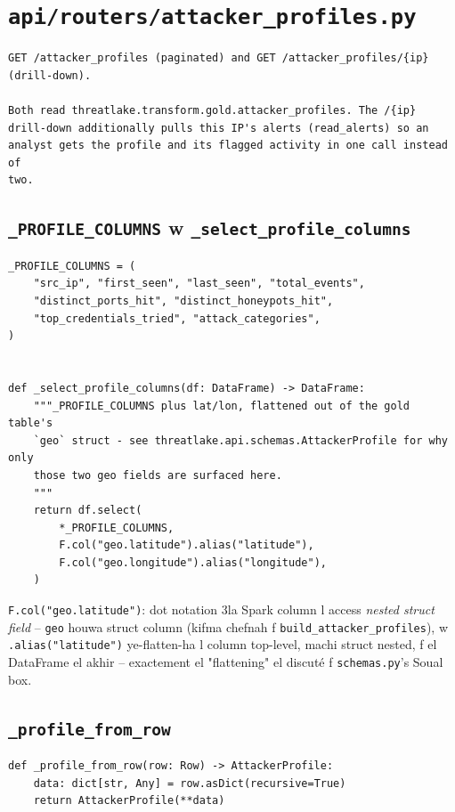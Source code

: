 \documentclass[11pt,a4paper]{report}
\DeclareRobustCommand{\code}[1]{\texttt{#1}}
\DeclareRobustCommand{\file}[1]{\texttt{\color{amber}#1}}
\begin{document}
\section{\file{api/routers/attacker\_profiles.py}}

\begin{lstlisting}[style=pystyle]
GET /attacker_profiles (paginated) and GET /attacker_profiles/{ip} (drill-down).

Both read threatlake.transform.gold.attacker_profiles. The /{ip}
drill-down additionally pulls this IP's alerts (read_alerts) so an
analyst gets the profile and its flagged activity in one call instead of
two.
\end{lstlisting}

\subsection{\code{\_PROFILE\_COLUMNS} w \code{\_select\_profile\_columns}}

\begin{lstlisting}[style=pystyle]
_PROFILE_COLUMNS = (
    "src_ip", "first_seen", "last_seen", "total_events",
    "distinct_ports_hit", "distinct_honeypots_hit",
    "top_credentials_tried", "attack_categories",
)


def _select_profile_columns(df: DataFrame) -> DataFrame:
    """_PROFILE_COLUMNS plus lat/lon, flattened out of the gold table's
    `geo` struct - see threatlake.api.schemas.AttackerProfile for why only
    those two geo fields are surfaced here.
    """
    return df.select(
        *_PROFILE_COLUMNS,
        F.col("geo.latitude").alias("latitude"),
        F.col("geo.longitude").alias("longitude"),
    )
\end{lstlisting}

\code{F.col("geo.latitude")}: dot notation 3la Spark column l access
\emph{nested struct field} -- \code{geo} houwa struct column (kifma
chefnah f \code{build\_attacker\_profiles}), w \code{.alias("latitude")}
ye-flatten-ha l column top-level, machi struct nested, f el DataFrame
el akhir -- exactement el "flattening" el discuté f \code{schemas.py}'s
Soual box.

\subsection{\code{\_profile\_from\_row}}

\begin{lstlisting}[style=pystyle]
def _profile_from_row(row: Row) -> AttackerProfile:
    data: dict[str, Any] = row.asDict(recursive=True)
    return AttackerProfile(**data)
\end{lstlisting}
\end{document}
